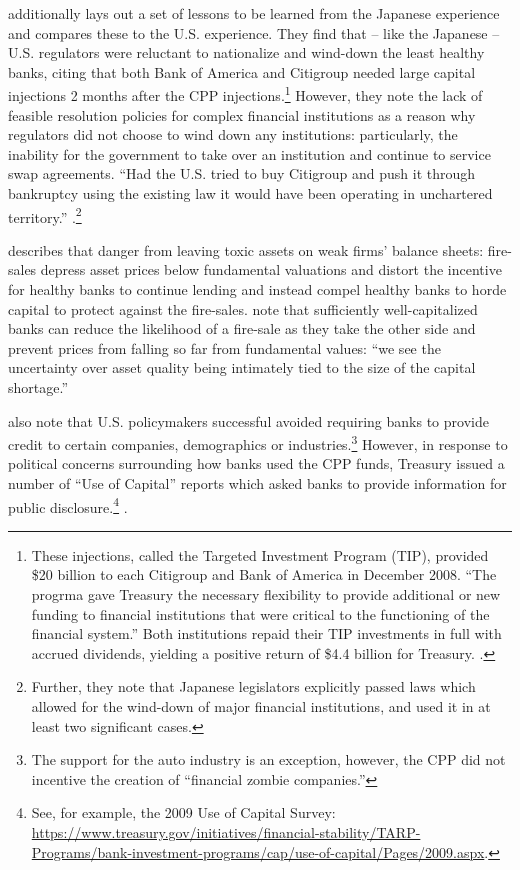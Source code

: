 \documentclass[12pt]{article}
\begin{document}
\citet{Hoshi} additionally lays out a set of lessons to be learned from the Japanese experience and compares these to the U.S. experience. They find that -- like the Japanese -- U.S. regulators were reluctant to nationalize and wind-down the least healthy banks, citing that both Bank of America and Citigroup needed large capital injections 2 months after the CPP injections.\footnote{These injections, called the Targeted Investment Program (TIP), provided \$20 billion to each Citigroup and Bank of America in December 2008. ``The progrma gave Treasury the necessary flexibility to provide additional or new funding to financial institutions that were critical to the functioning of the financial system.'' Both institutions repaid their TIP investments in full with accrued dividends, yielding a positive return of \$4.4 billion for Treasury. \citep{TIP}.} However, they note the lack of feasible resolution policies for complex financial institutions as a reason why regulators did not choose to wind down any institutions: particularly, the inability for the government to take over an institution and continue to service swap agreements. ``Had the U.S. tried to buy Citigroup and push it through bankruptcy using the existing law it would have been operating in unchartered territory.'' \citep{Hoshi}.\footnote{Further, they note that Japanese legislators explicitly passed laws which allowed for the wind-down of major financial institutions, and used it in at least two significant cases.} 

\citet{Diamond} describes that danger from leaving toxic assets on weak firms' balance sheets: fire-sales depress asset prices below fundamental valuations and distort the incentive for healthy banks to continue lending and instead compel healthy banks to horde capital to protect against the fire-sales. \citet{Hoshi} note that sufficiently well-capitalized banks can reduce the likelihood of a fire-sale as they take the other side and prevent prices from falling so far from fundamental values: ``we see the uncertainty over asset quality being intimately tied to the size of the capital shortage.'' 

\citet{Hoshi} also note that U.S. policymakers successful avoided requiring banks to provide credit to certain companies, demographics or industries.\footnote{The support for the auto industry is an exception, however, the CPP did not incentive the creation of ``financial zombie companies.''} However, in response to political concerns surrounding how banks used the CPP funds, Treasury issued a number of ``Use of Capital'' reports which asked banks to provide information for public disclosure.\footnote{See, for example, the 2009 Use of Capital Survey: \url{https://www.treasury.gov/initiatives/financial-stability/TARP-Programs/bank-investment-programs/cap/use-of-capital/Pages/2009.aspx}.} \citep{Bernanke}. 
\end{document}
